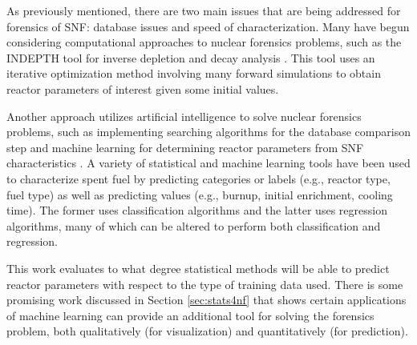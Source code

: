 As previously mentioned, there are two main issues that are being addressed for
forensics of \gls{SNF}: database issues and speed of characterization. Many
have begun considering computational approaches to nuclear forensics problems,
such as the INDEPTH tool for inverse depletion and decay analysis
\cite{weber_2006, weber_2010, weber_2011}. This tool uses an iterative
optimization method involving many forward simulations to obtain reactor
parameters of interest given some initial values. 

Another approach utilizes artificial intelligence to solve nuclear forensics
problems, such as implementing searching algorithms for the database comparison
step \cite{gey_search} and machine learning for determining reactor parameters
from \gls{SNF} characteristics \cite{dayman_feasibility_2013, nicolaou_2006,
nicolaou_2009, nicolaou_2014, robel_2009, jones_viz_2014, jones_snf_2014}.  A
variety of statistical and machine learning tools have been used to
characterize spent fuel by predicting categories or labels (e.g., reactor type, fuel
type) as well as predicting values (e.g., burnup, initial enrichment, cooling
time). The former uses classification algorithms and the latter uses regression
algorithms, many of which can be altered to perform both classification and 
regression.

This work evaluates to what degree statistical methods will be able to predict
reactor parameters with respect to the type of training data used.  There is
some promising work discussed in Section \ref{sec:stats4nf} that shows certain
applications of machine learning can provide an additional tool for solving the
forensics problem, both qualitatively (for visualization) and quantitatively
(for prediction).
